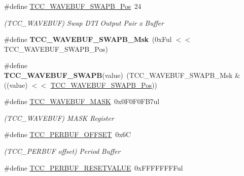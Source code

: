 \begin{DoxyCompactItemize}
\item 
\hypertarget{group___s_a_m_l21___t_c_c_gaa36949e1af5f01485dd1969e2dc3a9f0}{}\#define \hyperlink{group___s_a_m_l21___t_c_c_gaa36949e1af5f01485dd1969e2dc3a9f0}{T\+C\+C\+\_\+\+W\+A\+V\+E\+B\+U\+F\+\_\+\+S\+W\+A\+P\+B\+\_\+\+Pos}~24\label{group___s_a_m_l21___t_c_c_gaa36949e1af5f01485dd1969e2dc3a9f0}

\begin{DoxyCompactList}\small\item\em (T\+C\+C\+\_\+\+W\+A\+V\+E\+B\+U\+F) Swap D\+T\+I Output Pair x Buffer \end{DoxyCompactList}\item 
\hypertarget{group___s_a_m_l21___t_c_c_ga72987f059f1d6a3c8c07ad51b0503700}{}\#define {\bfseries T\+C\+C\+\_\+\+W\+A\+V\+E\+B\+U\+F\+\_\+\+S\+W\+A\+P\+B\+\_\+\+Msk}~(0x\+Ful $<$$<$ T\+C\+C\+\_\+\+W\+A\+V\+E\+B\+U\+F\+\_\+\+S\+W\+A\+P\+B\+\_\+\+Pos)\label{group___s_a_m_l21___t_c_c_ga72987f059f1d6a3c8c07ad51b0503700}

\item 
\hypertarget{group___s_a_m_l21___t_c_c_ga610f66b2bb275b727d60388be8883c43}{}\#define {\bfseries T\+C\+C\+\_\+\+W\+A\+V\+E\+B\+U\+F\+\_\+\+S\+W\+A\+P\+B}(value)~(T\+C\+C\+\_\+\+W\+A\+V\+E\+B\+U\+F\+\_\+\+S\+W\+A\+P\+B\+\_\+\+Msk \& ((value) $<$$<$ \hyperlink{group___s_a_m_l21___t_c_c_gaa36949e1af5f01485dd1969e2dc3a9f0}{T\+C\+C\+\_\+\+W\+A\+V\+E\+B\+U\+F\+\_\+\+S\+W\+A\+P\+B\+\_\+\+Pos}))\label{group___s_a_m_l21___t_c_c_ga610f66b2bb275b727d60388be8883c43}

\item 
\hypertarget{group___s_a_m_l21___t_c_c_gadc04bf9d21308195310c451f84672931}{}\#define \hyperlink{group___s_a_m_l21___t_c_c_gadc04bf9d21308195310c451f84672931}{T\+C\+C\+\_\+\+W\+A\+V\+E\+B\+U\+F\+\_\+\+M\+A\+S\+K}~0x0\+F0\+F0\+F\+B7ul\label{group___s_a_m_l21___t_c_c_gadc04bf9d21308195310c451f84672931}

\begin{DoxyCompactList}\small\item\em (T\+C\+C\+\_\+\+W\+A\+V\+E\+B\+U\+F) M\+A\+S\+K Register \end{DoxyCompactList}\item 
\hypertarget{group___s_a_m_l21___t_c_c_ga273f30736bce6a217ed58c341635b60e}{}\#define \hyperlink{group___s_a_m_l21___t_c_c_ga273f30736bce6a217ed58c341635b60e}{T\+C\+C\+\_\+\+P\+E\+R\+B\+U\+F\+\_\+\+O\+F\+F\+S\+E\+T}~0x6\+C\label{group___s_a_m_l21___t_c_c_ga273f30736bce6a217ed58c341635b60e}

\begin{DoxyCompactList}\small\item\em (T\+C\+C\+\_\+\+P\+E\+R\+B\+U\+F offset) Period Buffer \end{DoxyCompactList}\item 
\hypertarget{group___s_a_m_l21___t_c_c_gac281373111e65550580797ea6b9353a1}{}\#define \hyperlink{group___s_a_m_l21___t_c_c_gac281373111e65550580797ea6b9353a1}{T\+C\+C\+\_\+\+P\+E\+R\+B\+U\+F\+\_\+\+R\+E\+S\+E\+T\+V\+A\+L\+U\+E}~0x\+F\+F\+F\+F\+F\+F\+F\+Ful\label{group___s_a_m_l21___t_c_c_gac281373111e65550580797ea6b9353a1}


\end{DoxyCompactItemize}
